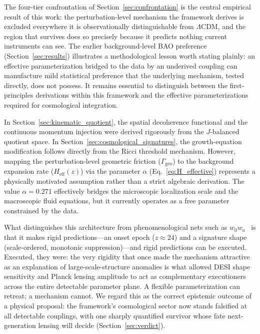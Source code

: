 \documentclass[aps,prd,twocolumn,superscriptaddress,nofootinbib]{revtex4-2}
\theoremstyle{definition}
\theoremstyle{remark}
\begin{document}
The four-tier confrontation of Section~\ref{sec:confrontation} is the
central empirical result of this work: the perturbation-level mechanism
the framework derives is excluded everywhere it is observationally
distinguishable from $\Lambda$CDM, and the region that survives does so
precisely because it predicts nothing current instruments can see. The
earlier background-level BAO preference
(Section~\ref{sec:results}) illustrates a methodological lesson worth
stating plainly: an effective parameterization bridged to the data by
an underived coupling can manufacture mild statistical preference that
the underlying mechanism, tested directly, does not possess. It remains
essential to distinguish between the first-principles derivations
within this framework and the effective parameterizations required for
cosmological integration.

In Section~\ref{sec:kinematic_quotient}, the spatial decoherence
functional and the continuous momentum injection were derived rigorously
from the $J$-balanced quotient space. In
Section~\ref{sec:cosmological_signatures}, the growth-equation
modification follows directly from the Ricci threshold mechanism.
However, mapping the perturbation-level geometric friction
($\Gamma_{\mathrm{geo}}$) to the background expansion rate
($H_{\mathrm{eff}}(z)$) via the parameter $\alpha$
(Eq.~\eqref{eq:H_effective}) represents a physically motivated
assumption rather than a strict algebraic derivation. The value
$\alpha = 0.271$ effectively bridges the microscopic localization
scale and the macroscopic fluid equations, but it currently operates
as a free parameter constrained by the data.

What distinguishes this architecture from phenomenological nets such as
$w_0 w_a$~\cite{DESI2024DE} is that it makes rigid predictions---an
onset epoch ($z \approx 24$) and a signature shape (scale-ordered,
monotonic suppression)---and rigid predictions can be executed.
Executed, they were: the very rigidity that once made the mechanism
attractive as an explanation of large-scale-structure anomalies is what
allowed DESI shape sensitivity and Planck lensing amplitude to act as
complementary executioners across the entire detectable parameter
plane. A flexible parameterization can retreat; a mechanism cannot. We
regard this as the correct epistemic outcome of a physical proposal:
the framework's cosmological sector now stands falsified at all
detectable couplings, with one sharply quantified survivor whose fate
next-generation lensing will decide
(Section~\ref{sec:verdict}).
\end{document}
